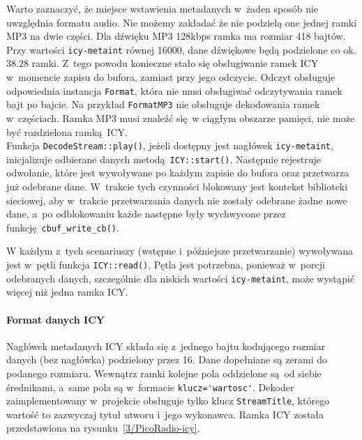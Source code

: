 \documentclass[polish]{aghengthesis}
\begin{document}
			Warto zaznaczyć, że miejsce wstawienia metadanych w~żaden sposób nie uwzględnia formatu audio. Nie możemy zakładać że nie podzielą one jednej ramki MP3 na dwie części. Dla dźwięku MP3 128kbps ramka ma rozmiar 418 bajtów. Przy wartości \lstinline|icy-metaint| równej 16000, dane dźwiękowe będą podzielone co ok. $38.28$ ramki. Z~tego powodu konieczne stało się obsługiwanie ramek ICY w~momencie zapisu do bufora, zamiast przy jego odczycie. Odczyt obsługuje odpowiednia instancja \lstinline|Format|, która nie musi obsługiwać odczytywania ramek bajt po bajcie. Na przykład \lstinline|FormatMP3| nie obsługuje dekodowania ramek w~częściach. Ramka MP3 musi znaleźć się w ciągłym obszarze pamięci, nie może być rozdzielona ramką ICY.
			$ $\\
			
			Funkcja \lstinline|DecodeStream::play()|, jeżeli dostępny jest nagłówek \lstinline|icy-metaint|, inicjalizuje odbierane danych metodą \lstinline|ICY::start()|. Następnie rejestruje odwołanie, które jest wywoływane po każdym zapisie do bufora oraz przetwarza już odebrane dane. W~trakcie tych czynności blokowany jest kontekst biblioteki sieciowej, aby w~trakcie przetwarzania danych nie zostały odebrane żadne nowe dane, a~po odblokowaniu każde następne były wychwycone przez funkcję \lstinline|cbuf_write_cb()|.
			
			W każdym z~tych scenariuszy (wstępne i~późniejsze przetwarzanie) wywoływana jest w~pętli funkcja \lstinline|ICY::read()|. Pętla jest potrzebna, ponieważ w~porcji odebranych danych, szczególnie dla niskich wartości \lstinline|icy-metaint|, może wystąpić więcej niż jedna ramka ICY.
			
			\paragraph{Format danych ICY}
				Nagłówek metadanych ICY składa się z~jednego bajtu kodującego rozmiar danych (bez nagłówka) podzielony przez 16. Dane dopełniane są zerami do podanego rozmiaru. Wewnątrz ramki kolejne pola oddzielone są od siebie średnikami, a~same pola są w~formacie \lstinline|klucz='wartosc'|. Dekoder zaimplementowany w~projekcie obsługuje tylko klucz \lstinline|StreamTitle|, którego wartość to zazwyczaj tytuł utworu i~jego wykonawca. Ramka ICY została przedstawiona na rysunku~\ref{3/PicoRadio-icy}.
				
\end{document}
